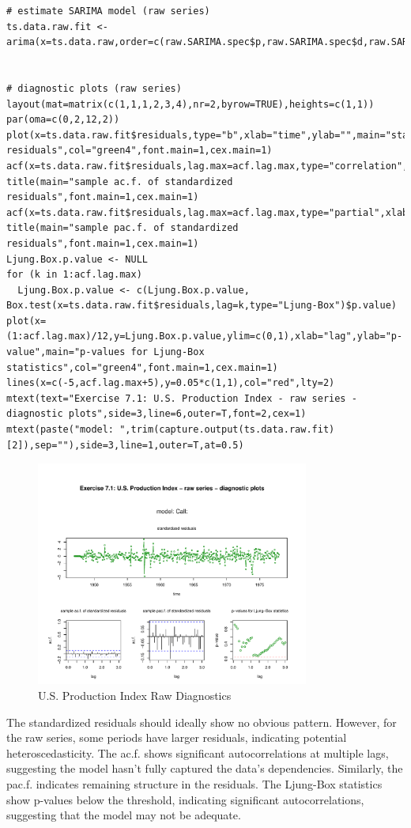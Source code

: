 \begin{lstlisting}
# estimate SARIMA model (raw series)
ts.data.raw.fit <- arima(x=ts.data.raw,order=c(raw.SARIMA.spec$p,raw.SARIMA.spec$d,raw.SARIMA.spec$q),seasonal=list(order=c(raw.SARIMA.spec$P,raw.SARIMA.spec$D,raw.SARIMA.spec$Q),period=raw.SARIMA.spec$freq))


# diagnostic plots (raw series)
layout(mat=matrix(c(1,1,1,2,3,4),nr=2,byrow=TRUE),heights=c(1,1))
par(oma=c(0,2,12,2))
plot(x=ts.data.raw.fit$residuals,type="b",xlab="time",ylab="",main="standardized residuals",col="green4",font.main=1,cex.main=1)
acf(x=ts.data.raw.fit$residuals,lag.max=acf.lag.max,type="correlation",xlab="lag",ylab="ac.f.",main="")
title(main="sample ac.f. of standardized residuals",font.main=1,cex.main=1)
acf(x=ts.data.raw.fit$residuals,lag.max=acf.lag.max,type="partial",xlab="lag",ylab="ac.f.",main="")
title(main="sample pac.f. of standardized residuals",font.main=1,cex.main=1)
Ljung.Box.p.value <- NULL
for (k in 1:acf.lag.max)
  Ljung.Box.p.value <- c(Ljung.Box.p.value, Box.test(x=ts.data.raw.fit$residuals,lag=k,type="Ljung-Box")$p.value)
plot(x=(1:acf.lag.max)/12,y=Ljung.Box.p.value,ylim=c(0,1),xlab="lag",ylab="p-value",main="p-values for Ljung-Box statistics",col="green4",font.main=1,cex.main=1)
lines(x=c(-5,acf.lag.max+5),y=0.05*c(1,1),col="red",lty=2)
mtext(text="Exercise 7.1: U.S. Production Index - raw series - diagnostic plots",side=3,line=6,outer=T,font=2,cex=1)
mtext(paste("model: ",trim(capture.output(ts.data.raw.fit)[2]),sep=""),side=3,line=1,outer=T,at=0.5)
\end{lstlisting}

\begin{figure}[H]
\centering
\includegraphics[width=0.8\textwidth]{plots/UsProdRawDiag.pdf}
\caption{U.S. Production Index Raw Diagnostics}
\end{figure}
The standardized residuals should ideally show no obvious pattern. However, for the raw series, some periods have larger residuals, indicating potential heteroscedasticity. The ac.f. shows significant autocorrelations at multiple lags, suggesting the model hasn't fully captured the data's dependencies. Similarly, the pac.f. indicates remaining structure in the residuals. The Ljung-Box statistics show p-values below the threshold, indicating significant autocorrelations, suggesting that the model may not be adequate.\\

